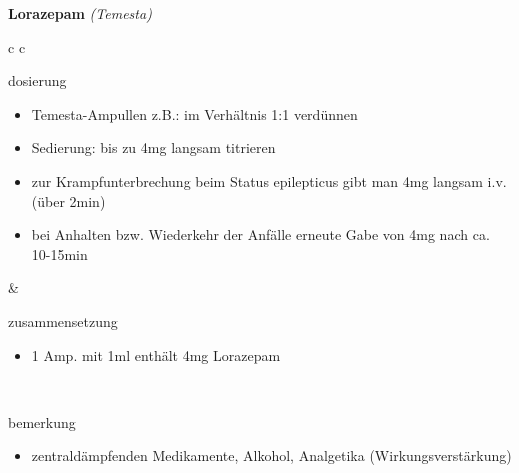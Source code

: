 \begin{frame}{
    \textbf{Lorazepam}
    \textit{(Temesta)}
}
    \begin{tabular}{c c}
        \begin{beamercolorbox}[wd=\boxwidth\textwidth,ht=\boxheight\textheight,sep=1em]{dosierung}
            \tiny
            \begin{itemize}
                \item Temesta-Ampullen z.B.: im Verhältnis 1:1 verdünnen
                \item Sedierung: bis zu 4mg langsam titrieren
                \item zur Krampfunterbrechung beim Status epilepticus gibt man 4mg langsam i.v. (über 2min)
                \item bei Anhalten bzw. Wiederkehr der Anfälle erneute Gabe von 4mg nach ca. 10-15min
            \end{itemize}
        \end{beamercolorbox} & 
        \begin{beamercolorbox}[wd=\boxwidth\textwidth,ht=\boxheight\textheight,sep=1em]{zusammensetzung}
            \begin{itemize}
                \item 1 Amp. mit 1ml enthält 4mg Lorazepam
            \end{itemize}
        \end{beamercolorbox} \\
        \begin{beamercolorbox}[wd=\textwidth,ht=\boxheight\textheight,sep=1em]{bemerkung}
            \begin{itemize}
                \item zentraldämpfenden Medikamente, Alkohol, Analgetika (Wirkungsverstärkung)
            \end{itemize}
        \end{beamercolorbox} \\
    \end{tabular}
\end{frame}

